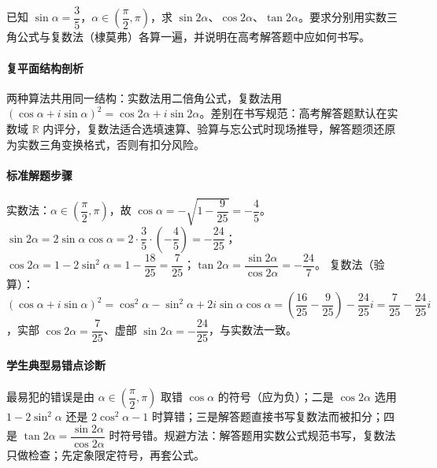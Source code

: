 \begin{problem}
已知 $\sin\alpha=\dfrac35$，$\alpha\in\left(\dfrac{\pi}{2},\pi\right)$，求 $\sin2\alpha$、$\cos2\alpha$、$\tan2\alpha$。要求分别用实数三角公式与复数法（棣莫弗）各算一遍，并说明在高考解答题中应如何书写。
\end{problem}
\begin{solution}
\paragraph{复平面结构剖析}
两种算法共用同一结构：实数法用二倍角公式，复数法用 $(\cos\alpha+i\sin\alpha)^2=\cos2\alpha+i\sin2\alpha$。差别在书写规范：高考解答题默认在实数域 $\mathbb{R}$ 内评分，复数法适合选填速算、验算与忘公式时现场推导，解答题须还原为实数三角变换格式，否则有扣分风险。
\paragraph{标准解题步骤}
实数法：$\alpha\in\left(\dfrac{\pi}{2},\pi\right)$，故 $\cos\alpha=-\sqrt{1-\dfrac{9}{25}}=-\dfrac45$。$\sin2\alpha=2\sin\alpha\cos\alpha=2\cdot\dfrac35\cdot\left(-\dfrac45\right)=-\dfrac{24}{25}$；$\cos2\alpha=1-2\sin^2\alpha=1-\dfrac{18}{25}=\dfrac{7}{25}$；$\tan2\alpha=\dfrac{\sin2\alpha}{\cos2\alpha}=-\dfrac{24}{7}$。
复数法（验算）：$(\cos\alpha+i\sin\alpha)^2=\cos^2\alpha-\sin^2\alpha+2i\sin\alpha\cos\alpha=\left(\dfrac{16}{25}-\dfrac{9}{25}\right)-\dfrac{24}{25}i=\dfrac{7}{25}-\dfrac{24}{25}i$，实部 $\cos2\alpha=\dfrac{7}{25}$、虚部 $\sin2\alpha=-\dfrac{24}{25}$，与实数法一致。
\paragraph{学生典型易错点诊断}
最易犯的错误是由 $\alpha\in\left(\dfrac{\pi}{2},\pi\right)$ 取错 $\cos\alpha$ 的符号（应为负）；二是 $\cos2\alpha$ 选用 $1-2\sin^2\alpha$ 还是 $2\cos^2\alpha-1$ 时算错；三是解答题直接书写复数法而被扣分；四是 $\tan2\alpha=\dfrac{\sin2\alpha}{\cos2\alpha}$ 时符号错。规避方法：解答题用实数公式规范书写，复数法只做检查；先定象限定符号，再套公式。
\end{solution}
